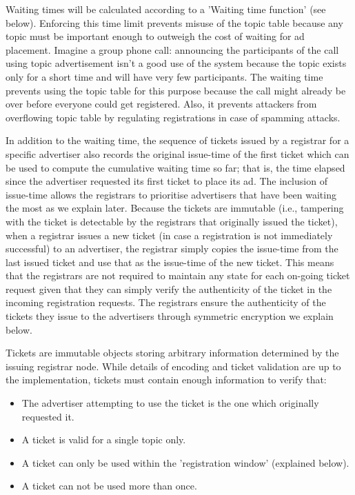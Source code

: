 Waiting times will be calculated according to a 'Waiting time function' (see below). Enforcing this time limit prevents misuse of the topic table because any topic must be important enough to outweigh the cost of waiting for ad placement. Imagine a group phone call: announcing the participants of the call using topic advertisement isn't a good use of the system because the topic exists only for a short time and will have very few participants. The waiting time prevents using the topic table for this purpose because the call might already be over before everyone could get registered. Also, it prevents attackers from overflowing topic table by regulating registrations in case of spamming attacks.

In addition to the waiting time,  the sequence of tickets issued by a registrar for a specific advertiser also records the original issue-time of the first ticket which can be used to compute the cumulative waiting time so far; that is, the time elapsed since the advertiser requested its first ticket to place its ad. The inclusion of issue-time allows the registrars to prioritise advertisers that have been waiting the most as we explain later. Because the tickets are immutable (i.e., tampering with the ticket is detectable by the registrars that originally issued the ticket), when a registrar issues a new ticket (in case a registration is not immediately successful) to an advertiser, the registrar simply copies the issue-time from the last issued ticket and use that as the issue-time of the new ticket. This means that the registrars are not required to maintain any state for each on-going ticket request given that they can simply verify the authenticity of the ticket in the incoming registration requests. The registrars ensure the authenticity of the tickets they issue to the advertisers through symmetric encryption we explain below.

Tickets are immutable objects storing arbitrary information determined by the issuing registrar node.  While details of encoding and ticket validation are up to the implementation, tickets must contain enough information to verify that:
\begin{itemize}
    \item The advertiser attempting to use the ticket is the one which originally requested it.
    \item A ticket is valid for a single topic only.
    \item A ticket can only be used within the 'registration window' (explained below).
    \item A ticket can not be used more than once. 
\end{itemize}

